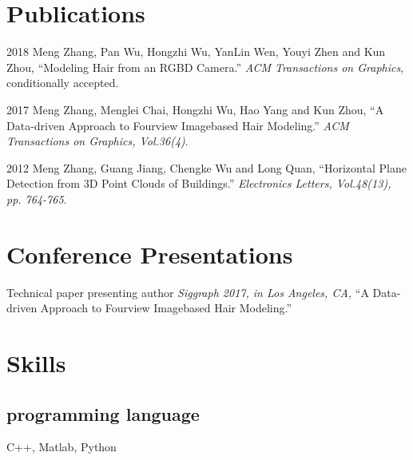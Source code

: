 \documentclass[11pt,letterpaper]{report}
\newcommand{\listitemspace}{0.15em}
\renewenvironment{itemize}
{\begin{list}{}{\setlength{\leftmargin}{0em}
				\setlength{\parskip}{0em}
				\setlength{\itemsep}{\listitemspace}
				\setlength{\parsep}{\listitemspace}}}
{\end{list}}
\begin{document}
\section*{Publications}

\begin{tablist}
	
\item[2018] \tab Meng Zhang, Pan Wu, Hongzhi Wu, YanLin Wen, Youyi Zhen and Kun Zhou, \enquote{Modeling Hair from an RGB\-D Camera.} \textit{ACM Transactions on Graphics}, conditionally accepted.

\item[2017] \tab Meng Zhang, Menglei Chai, Hongzhi Wu, Hao Yang and Kun Zhou, \enquote{A Data-driven Approach to Four\-view Image\-based Hair Modeling.} \textit{ACM Transactions on Graphics, Vol.36(4)}.
		
\item[2012] \tab Meng Zhang, Guang Jiang, Chengke Wu and Long Quan, \enquote{Horizontal Plane Detection from 3D Point Clouds of Buildings.} \textit{Electronics Letters, Vol.48(13), pp. 764-765}.

\end{tablist}

\section*{Conference Presentations}
\begin{itemize}
\item Technical paper presenting author \tab \textit{Siggraph 2017, in Los Angeles, CA,} \enquote{A Data-driven Approach to Four\-view Image\-based Hair Modeling.}\bigskip
\end{itemize}


\section*{Skills}

\subsection*{programming language}

\begin{itemize}
	
\item C++, Matlab, Python

\end{itemize}




\end{document}
